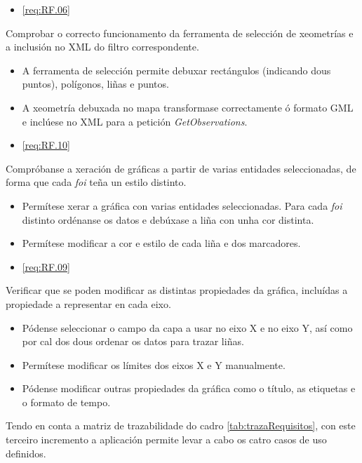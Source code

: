 		  {\begin{itemize}\item \ref{req:RF.06} \\\end{itemize}} %
		  {Comprobar o correcto funcionamento da ferramenta de selección de xeometrías e a inclusión no XML do filtro correspondente.} %
		  {\begin{itemize}
		  \item A ferramenta de selección permite debuxar rectángulos (indicando dous puntos), polígonos, liñas e puntos.
		  \item A xeometría debuxada no mapa transformase correctamente ó formato GML e inclúese no XML para a petición \emph{GetObservations}.
		  \end{itemize}} %
		  
		  {\begin{itemize}\item \ref{req:RF.10} \\\end{itemize}} %
		  {Compróbanse a xeración de gráficas a partir de varias entidades seleccionadas, de forma que cada \emph{foi} teña un estilo distinto.} %
		  {\begin{itemize}
		  \item Permítese xerar a gráfica con varias entidades seleccionadas. Para cada \emph{foi} distinto ordénanse os datos e debúxase a liña con unha cor distinta.
		  \item Permítese modificar a cor e estilo de cada liña e dos marcadores.
		  \end{itemize}} %
		  
		  {\begin{itemize}\item \ref{req:RF.09} \\\end{itemize}} %
		  {Verificar que se poden modificar as distintas propiedades da gráfica, incluídas a propiedade a representar en cada eixo.} %
		  {\begin{itemize}
		  \item Pódense seleccionar o campo da capa a usar no eixo X e no eixo Y, así como por cal dos dous ordenar os datos para trazar liñas.
		  \item Permítese modificar os límites dos eixos X e Y manualmente.
		  \item Pódense modificar outras propiedades da gráfica como o título, as etiquetas e o formato de tempo.
		  \end{itemize}} %
		  
Tendo en conta a matriz de trazabilidade do cadro \ref{tab:trazaRequisitos}, con este terceiro incremento a aplicación permite levar a cabo os catro casos de uso definidos.